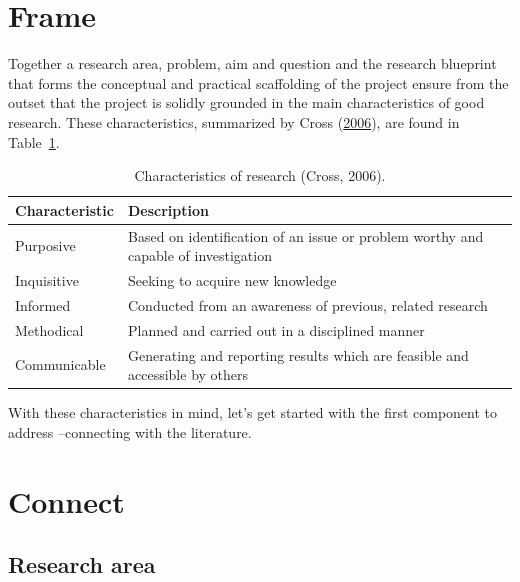 \documentclass[
  letterpaper,
  DIV=11,
  numbers=noendperiod]{scrreport}
\theoremstyle{definition}
\theoremstyle{remark}
\begin{document}
\hypertarget{sec-fr-frame}{%
\section{Frame}\label{sec-fr-frame}}

Together a research area, problem, aim and question and the research
blueprint that forms the conceptual and practical scaffolding of the
project ensure from the outset that the project is solidly grounded in
the main characteristics of good research. These characteristics,
summarized by Cross (\protect\hyperlink{ref-Cross2006}{2006}), are found
in Table~\ref{tbl-fr-cross-research-char-table}.

\hypertarget{tbl-fr-cross-research-char-table}{}
\begin{table}
\caption{\label{tbl-fr-cross-research-char-table}Characteristics of research (Cross, 2006). }\tabularnewline

\centering
\begin{tabular}{l|l}
\hline
Characteristic & Description\\
\hline
Purposive & Based on identification of an issue or problem worthy and capable of investigation\\
\hline
Inquisitive & Seeking to acquire new knowledge\\
\hline
Informed & Conducted from an awareness of previous, related research\\
\hline
Methodical & Planned and carried out in a disciplined manner\\
\hline
Communicable & Generating and reporting results which are feasible and accessible by others\\
\hline
\end{tabular}
\end{table}

With these characteristics in mind, let's get started with the first
component to address --connecting with the literature.

\hypertarget{sec-fr-connect}{%
\section{Connect}\label{sec-fr-connect}}

\hypertarget{research-area}{%
\subsection{Research area}\label{research-area}}
\end{document}
